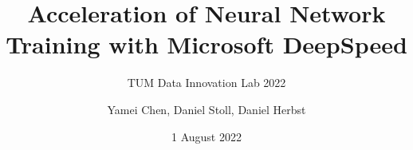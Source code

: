 \documentclass[12pt, aspectratio=169]{beamer}
\title{Acceleration of Neural Network Training with Microsoft DeepSpeed}
\subtitle{TUM Data Innovation Lab 2022}
\author{Yamei Chen, Daniel Stoll, Daniel Herbst}
\date{1 August 2022}
\begin{document}
	
	\begin{frame}[plain]
		\maketitle
	\end{frame}

	\begin{frame}
		\tableofcontents
	\end{frame}

	
	
	
	
	
\end{document}
